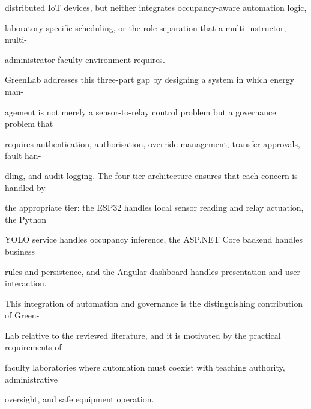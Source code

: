 distributed IoT devices, but neither integrates occupancy-aware automation logic,

laboratory-speciﬁc scheduling, or the role separation that a multi-instructor, multi-

administrator faculty environment requires.

GreenLab addresses this three-part gap by designing a system in which energy man-

agement is not merely a sensor-to-relay control problem but a governance problem that

requires authentication, authorisation, override management, transfer approvals, fault han-

dling, and audit logging. The four-tier architecture ensures that each concern is handled by

the appropriate tier: the ESP32 handles local sensor reading and relay actuation, the Python

YOLO service handles occupancy inference, the ASP.NET Core backend handles business

rules and persistence, and the Angular dashboard handles presentation and user interaction.

This integration of automation and governance is the distinguishing contribution of Green-

Lab relative to the reviewed literature, and it is motivated by the practical requirements of

faculty laboratories where automation must coexist with teaching authority, administrative

oversight, and safe equipment operation.


